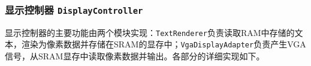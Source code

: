 \subsubsection[显示控制器]{显示控制器 \texttt{DisplayController}}
显示控制器的主要功能由两个模块实现：\texttt{TextRenderer}负责读取RAM中存储的文本，渲染为像素数据并存储在SRAM的显存中；\texttt{VgaDisplayAdapter}负责产生VGA信号，从SRAM显存中读取像素数据并输出。各部分的详细实现如下。